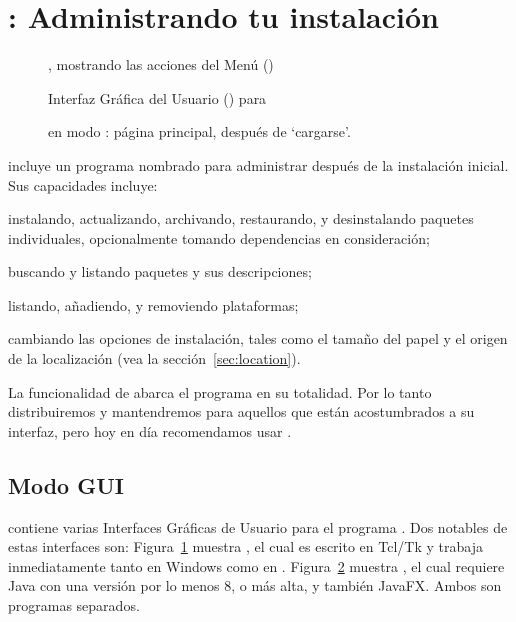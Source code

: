 \documentclass{article}
\begin{document}
\section{: Administrando tu instalación}
\label{sec:tlmgr}

\begin{figure}[tb]
\caption{ \GUI, mostrando las acciones del
	Menú (\MacOSX)}
\label{fig:tlshell}
\end{figure}

\begin{figure}[tb]
	\caption{ Interfaz Gráfica del Usuario (\GUI{}) para }
\label{fig:tlcockpit}
\end{figure}

\begin{figure}[tb]
\caption{ en modo \GUI: página principal, después de
`cargarse'.}
\label{fig:tlmgr-gui}
\end{figure}

\TL{} incluye un programa nombrado  para administrar \TL{}
después de la instalación inicial. Sus capacidades incluye:

\begin{itemize*}
\item instalando, actualizando, archivando, restaurando, y
	desinstalando paquetes individuales, opcionalmente tomando
	dependencias en consideración;
\item buscando y listando paquetes y sus descripciones;
\item listando, añadiendo, y removiendo plataformas;
\item cambiando las opciones de instalación, tales como el tamaño del
	papel y el origen de la localización (vea la
	sección~\ref{sec:location}).
\end{itemize*}

La funcionalidad de  abarca el programa  en su
totalidad. Por lo tanto distribuiremos y mantendremos  para
aquellos que están acostumbrados a su interfaz, pero hoy en día recomendamos
usar . 

\subsection{ Modo GUI}

\TL{} contiene varias Interfaces Gráficas de Usuario \GUI para el
programa . Dos notables de estas interfaces son:
Figura~\ref{fig:tlshell} muestra , el cual es escrito
en Tcl/Tk y trabaja inmediatamente tanto en Windows como en \MacOSX.
Figura~\ref{fig:tlcockpit} muestra , el cual requiere
Java con una versión por lo menos 8, o más alta, y también JavaFX. Ambos
son programas separados.
\end{document}
